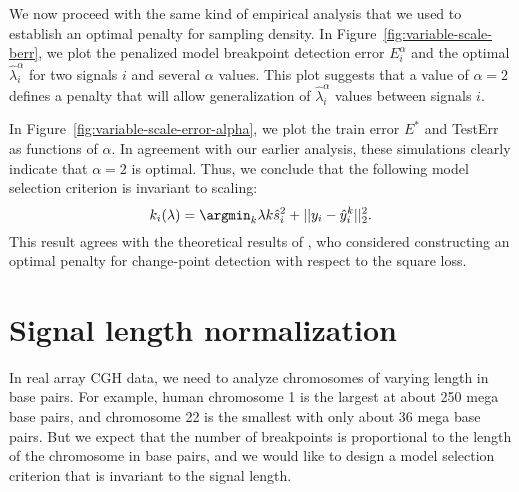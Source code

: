 \documentclass{article}
\begin{document}
\newpage

We now proceed with the same kind of empirical analysis that we used
to establish an optimal penalty for sampling density. In
Figure~\ref{fig:variable-scale-berr}, we plot the penalized model
breakpoint detection error $E_i^\alpha$ and the optimal $\hat
\lambda_i^\alpha$ for two signals $i$ and several $\alpha$ values.
This plot suggests that a value of $\alpha=2$ defines a penalty that
will allow generalization of $\hat \lambda^\alpha_i$ values between
signals $i$.


\newpage

In Figure~\ref{fig:variable-scale-error-alpha}, we plot the train
error $E^*$ and TestErr as functions of $\alpha$.  In agreement with
our earlier analysis, these simulations clearly indicate that
$\alpha=2$ is optimal. Thus, we conclude that the following model
selection criterion is invariant to scaling:
\begin{equation}
  \label{eq:kstar_shat_opt}
  k_i(\lambda) = \argmin_k \lambda k \hat s_i^2 + ||y_i-\hat y_i^k||^2_2.
\end{equation}
This result agrees with the theoretical results of \citet{lebarbier},
who considered constructing an optimal penalty for change-point
detection with respect to the square loss.





\newpage
\section{Signal length normalization}
\label{variable_size}
In real array CGH data, we need to analyze chromosomes of varying length
in base pairs. For example, human chromosome 1 is the largest at about
250 mega base pairs, and chromosome 22 is the smallest with only about
36 mega base pairs. But we expect that the number of breakpoints is
proportional to the length of the chromosome in base pairs, and we would
like to design a model selection criterion that is invariant to the
signal length.
\end{document}
